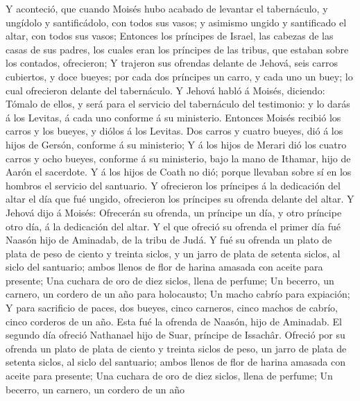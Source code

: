  Y aconteció, que cuando Moisés hubo acabado de levantar
el tabernáculo, y ungídolo y santificádolo, con todos sus vasos; y
asimismo ungido y santificado el altar, con todos sus vasos;
 Entonces los príncipes de Israel, las cabezas de las
casas de sus padres, los cuales eran los príncipes de las tribus, que
estaban sobre los contados, ofrecieron;  Y trajeron sus
ofrendas delante de Jehová, seis carros cubiertos, y doce bueyes; por
cada dos príncipes un carro, y cada uno un buey; lo cual ofrecieron
delante del tabernáculo.  Y Jehová habló á Moisés,
diciendo:  Tómalo de ellos, y será para el servicio del
tabernáculo del testimonio: y lo darás á los Levitas, á cada uno
conforme á su ministerio.  Entonces Moisés recibió los
carros y los bueyes, y diólos á los Levitas.  Dos carros y
cuatro bueyes, dió á los hijos de Gersón, conforme á su ministerio;
 Y á los hijos de Merari dió los cuatro carros y ocho
bueyes, conforme á su ministerio, bajo la mano de Ithamar, hijo de Aarón
el sacerdote.  Y á los hijos de Coath no dió; porque
llevaban sobre sí en los hombros el servicio del santuario.
 Y ofrecieron los príncipes á la dedicación del altar el
día que fué ungido, ofrecieron los príncipes su ofrenda delante del
altar.  Y Jehová dijo á Moisés: Ofrecerán su ofrenda, un
príncipe un día, y otro príncipe otro día, á la dedicación del altar.
 Y el que ofreció su ofrenda el primer día fué Naasón
hijo de Aminadab, de la tribu de Judá.  Y fué su ofrenda
un plato de plata de peso de ciento y treinta siclos, y un jarro de
plata de setenta siclos, al siclo del santuario; ambos llenos de flor de
harina amasada con aceite para presente;  Una cuchara de
oro de diez siclos, llena de perfume;  Un becerro, un
carnero, un cordero de un año para holocausto;  Un macho
cabrío para expiación;  Y para sacrificio de paces, dos
bueyes, cinco carneros, cinco machos de cabrío, cinco corderos de un
año. Esta fué la ofrenda de Naasón, hijo de Aminadab.  El
segundo día ofreció Nathanael hijo de Suar, príncipe de Issachâr.
 Ofreció por su ofrenda un plato de plata de ciento y
treinta siclos de peso, un jarro de plata de setenta siclos, al siclo
del santuario; ambos llenos de flor de harina amasada con aceite para
presente;  Una cuchara de oro de diez siclos, llena de
perfume;  Un becerro, un carnero, un cordero de un año
